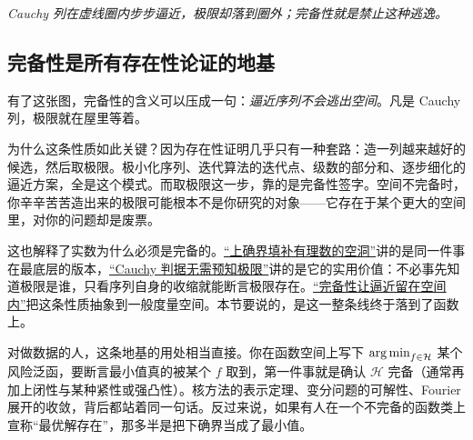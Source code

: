 \begin{center}
\end{center}

\emph{Cauchy 列在虚线圈内步步逼近，极限却落到圈外；完备性就是禁止这种逃逸。}

\subsection{完备性是所有存在性论证的地基}

有了这张图，完备性的含义可以压成一句：\emph{逼近序列不会逃出空间}。凡是 Cauchy 列，极限就在屋里等着。

为什么这条性质如此关键？因为存在性证明几乎只有一种套路：造一列越来越好的候选，然后取极限。极小化序列、迭代算法的迭代点、级数的部分和、逐步细化的逼近方案，全是这个模式。而取极限这一步，靠的是完备性签字。空间不完备时，你辛辛苦苦造出来的极限可能根本不是你研究的对象——它存在于某个更大的空间里，对你的问题却是废票。

这也解释了实数为什么必须是完备的。\hyperref[sec:12-Real-Analysis-Support/01-Real-Numbers-and-Completeness/01]{``上确界填补有理数的空洞''}讲的是同一件事在最底层的版本，\hyperref[sec:12-Real-Analysis-Support/01-Real-Numbers-and-Completeness/02]{``Cauchy 判据无需预知极限''}讲的是它的实用价值：不必事先知道极限是谁，只看序列自身的收缩就能断言极限存在。\hyperref[sec:12-Real-Analysis-Support/03-Topology-Basics/03]{``完备性让逼近留在空间内''}把这条性质抽象到一般度量空间。本节要说的，是这一整条线终于落到了函数上。

对做数据的人，这条地基的用处相当直接。你在函数空间上写下 \(\operatorname*{arg\,min}_{f\in\mathcal H}\) 某个风险泛函，要断言最小值真的被某个 \(f\) 取到，第一件事就是确认 \(\mathcal H\) 完备（通常再加上闭性与某种紧性或强凸性）。核方法的表示定理、变分问题的可解性、Fourier 展开的收敛，背后都站着同一句话。反过来说，如果有人在一个不完备的函数类上宣称``最优解存在''，那多半是把下确界当成了最小值。

